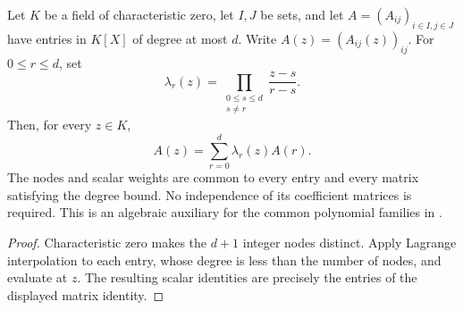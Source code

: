 \begin{lemma}
    \label{lem:matrix_polynomial_lagrange}
    \leanok
    Let $K$ be a field of characteristic zero, let $I,J$ be sets, and
    let $A=(A_{ij})_{i\in I,j\in J}$ have entries in $K[X]$ of degree at
    most $d$. Write $A(z)=(A_{ij}(z))_{ij}$. For $0\le r\le d$, set
    \[
        \lambda_r(z)=\prod_{\substack{0\le s\le d\\s\ne r}}
              \frac{z-s}{r-s}.
    \]
    Then, for every $z\in K$,
    \[
        A(z)=\sum_{r=0}^d\lambda_r(z)A(r).
    \]
    The nodes and scalar weights are common to every entry and every
    matrix satisfying the degree bound. No independence of its coefficient
    matrices is required. This is an algebraic auxiliary for the common
    polynomial families in \cite[Proposition~5.7]{Arad2016RigorousRG}.
\end{lemma}
\begin{proof}\leanok
    Characteristic zero makes the $d+1$ integer nodes distinct.
    Apply Lagrange interpolation to each entry, whose degree is less
    than the number of nodes, and evaluate at $z$. The resulting scalar
    identities are precisely the entries of the displayed matrix identity.
\end{proof}
